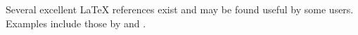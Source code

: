 Several excellent LaTeX references exist and may be found useful by some users. Examples include those by \citet{Knuth_1984_a} and \citet{Lamport_1986_a}.
